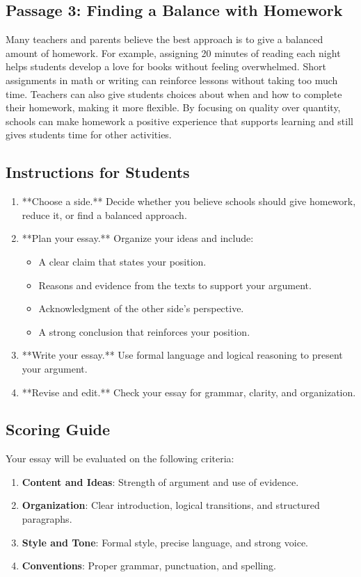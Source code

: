 \documentclass[12pt]{article}
\begin{document}
\subsection*{Passage 3: Finding a Balance with Homework}

Many teachers and parents believe the best approach is to give a balanced amount of homework. For example, assigning 20 minutes of reading each night helps students develop a love for books without feeling overwhelmed. Short assignments in math or writing can reinforce lessons without taking too much time. Teachers can also give students choices about when and how to complete their homework, making it more flexible. By focusing on quality over quantity, schools can make homework a positive experience that supports learning and still gives students time for other activities.

\subsection*{Instructions for Students}

\begin{enumerate}
    \item **Choose a side.** Decide whether you believe schools should give homework, reduce it, or find a balanced approach.
    \item **Plan your essay.** Organize your ideas and include:
    \begin{itemize}
        \item A clear claim that states your position.
        \item Reasons and evidence from the texts to support your argument.
        \item Acknowledgment of the other side’s perspective.
        \item A strong conclusion that reinforces your position.
    \end{itemize}
    \item **Write your essay.** Use formal language and logical reasoning to present your argument.
    \item **Revise and edit.** Check your essay for grammar, clarity, and organization.
\end{enumerate}

\subsection*{Scoring Guide}

Your essay will be evaluated on the following criteria:
\begin{enumerate}
    \item \textbf{Content and Ideas}: Strength of argument and use of evidence.
    \item \textbf{Organization}: Clear introduction, logical transitions, and structured paragraphs.
    \item \textbf{Style and Tone}: Formal style, precise language, and strong voice.
    \item \textbf{Conventions}: Proper grammar, punctuation, and spelling.
\end{enumerate}
\end{document}
